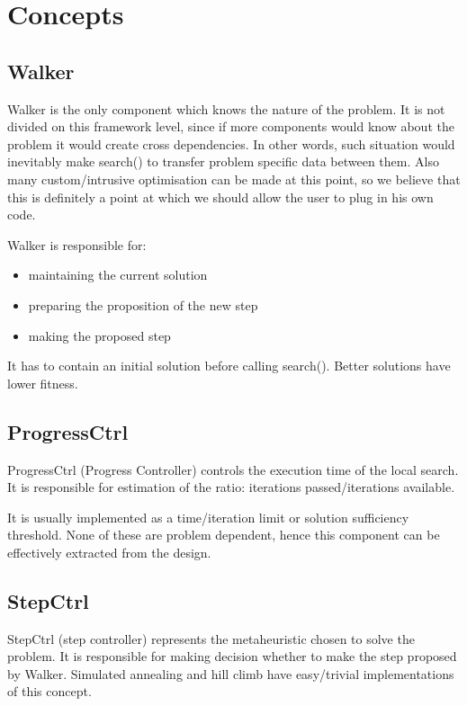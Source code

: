 \section{Concepts}

\subsection{Walker}

Walker is the only component which knows the nature of the problem.
It is not divided on this framework level, since if more components would know about the problem it would create cross dependencies.
In other words, such situation would inevitably make search() to transfer problem specific data between them.
Also many custom/intrusive optimisation can be made at this point, so we believe that this is definitely a point at which we should allow the user to plug in
his own code.

Walker is responsible for:
\begin{itemize}
\item maintaining the current solution
\item preparing the proposition of the new step
\item making the proposed step
\end{itemize}

It has to contain an initial solution before calling search().
Better solutions have lower fitness.

\subsection{ProgressCtrl}

ProgressCtrl (Progress Controller) controls the execution time of the
local search. It is responsible for estimation of the ratio: iterations
passed/iterations available.

It is usually implemented as a time/iteration limit or solution sufficiency threshold.
None of these are problem dependent, hence this component can be effectively extracted from the design.

\subsection{StepCtrl}

StepCtrl (step controller) represents the metaheuristic chosen to
solve the problem. It is responsible for making decision whether to
make the step proposed by Walker.
Simulated annealing and hill climb have easy/trivial implementations of this concept.

